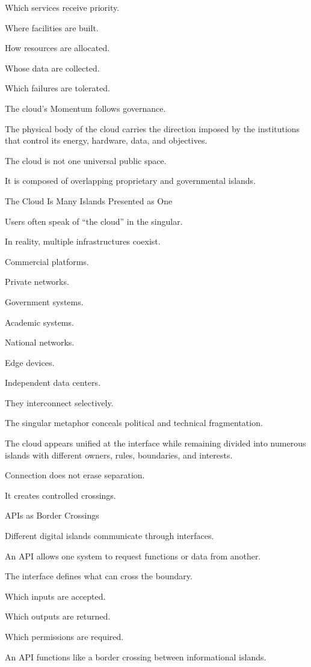 Which services receive priority.

Where facilities are built.

How resources are allocated.

Whose data are collected.

Which failures are tolerated.

The cloud’s Momentum follows governance.

The physical body of the cloud carries the direction imposed by the institutions that control its energy, hardware, data, and objectives.

The cloud is not one universal public space.

It is composed of overlapping proprietary and governmental islands.

The Cloud Is Many Islands Presented as One

Users often speak of “the cloud” in the singular.

In reality, multiple infrastructures coexist.

Commercial platforms.

Private networks.

Government systems.

Academic systems.

National networks.

Edge devices.

Independent data centers.

They interconnect selectively.

The singular metaphor conceals political and technical fragmentation.

The cloud appears unified at the interface while remaining divided into numerous islands with different owners, rules, boundaries, and interests.

Connection does not erase separation.

It creates controlled crossings.

APIs as Border Crossings

Different digital islands communicate through interfaces.

An API allows one system to request functions or data from another.

The interface defines what can cross the boundary.

Which inputs are accepted.

Which outputs are returned.

Which permissions are required.

An API functions like a border crossing between informational islands.

